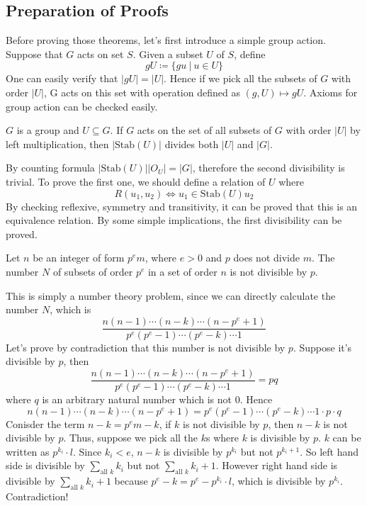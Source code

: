 \documentclass{article}
\begin{document}
\subsection{Preparation of Proofs}
Before proving those theorems, let's first introduce a simple group action. Suppose that $G$ acts on set $S$. Given a subset $U$ of $S$, define
$$
gU \coloneqq \{gu\ |\ u \in U\}
$$
One can easily verify that $|gU| = |U|$. Hence if we pick all the subsets of $G$ with order $|U|$, G acts on this set with operation defined as $(g, U)\mapsto gU$. Axioms for group action
 can be checked easily.
\begin{lemma}{ }
$G$ is a group and $U \subseteq G$. If $G$ acts on the set of all subsets of $G$ with order $|U|$ by left multiplication, then $|\text{Stab}(U)|$ divides both $|U|$ and $|G|$.
\end{lemma}
By counting formula $|\text{Stab}(U)| |O_U| = |G|$, therefore the second divisibility is trivial. To prove the first one, we should define a relation of $U$ where 
$$
R(u_1,u_2)\Longleftrightarrow u_1 \in \text{Stab}(U) u_2
$$
By checking reflexive, symmetry and transitivity, it can be proved that this is an equivalence relation. By some simple implications, the first divisibility can be proved.
\begin{lemma}{ }
Let $n$ be an integer of form $p^{e}m$, where $e > 0$ and $p$ does not divide $m$. The number $N$ of subsets of order $p^{e}$ in a set of order $n$ is not divisible by $p$.
\end{lemma}
This is simply a number theory problem, since we can directly calculate the number $N$, which is 
$$
\frac{n(n-1)\cdots(n-k)\cdots(n - p^e + 1)}{p^e (p^e - 1)\cdots (p^e - k) \cdots 1}
$$
Let's prove by contradiction that this number is not divisible by $p$. Suppose it's divisible by $p$, then 
$$
\frac{n(n-1)\cdots(n-k)\cdots(n - p^e + 1)}{p^e (p^e - 1)\cdots (p^e - k) \cdots 1} = p q
$$
where $q$ is an arbitrary natural number which is not $0$. Hence
$$
n(n-1)\cdots(n-k)\cdots(n - p^e + 1) = p^e (p^e - 1)\cdots (p^e - k) \cdots 1 \cdot p \cdot q
$$
Conisder the term $n - k = p^e m - k$, if $k$ is not divisible by $p$, then $n-k$ is not divisible by $p$. Thus, suppose we pick 
all the $k$s where $k$ is divisible by $p$. $k$ can be written as $p^{k_i} \cdot l$. Since $k_i < e$, $n - k$ is divisible by $p^{k_i}$ but not 
$p^{k_i + 1}$. So left hand side is divisible by $\sum_{\text{all }k} k_i$ but not $\sum_{\text{all }k} k_i + 1$. However right hand side is divisible by 
$\sum_{\text{all }k} k_i + 1$ because $p^e - k = p^e - p^{k_i} \cdot l$, which is divisible by $p^{k_i}$. Contradiction!
\end{document}
